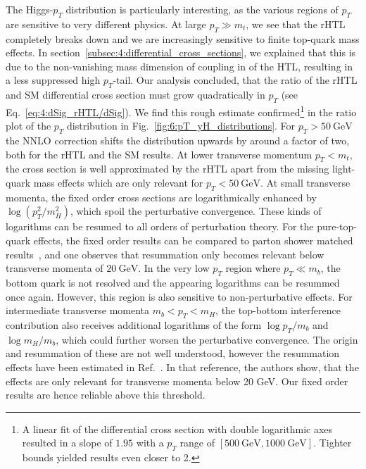 The Higgs-$p_T$ distribution is particularly interesting, as the various regions of $p_T$ are sensitive to very different physics. At large $p_T \gg m_t$, we see that the \acs{rHTL} completely breaks down and we are increasingly sensitive to finite top-quark mass effects. In section~\ref{subsec:4:differential_cross_sections}, we explained that this is due to the non-vanishing mass dimension of coupling in of the \acs{HTL}, resulting in a less suppressed high $p_T$-tail. Our analysis concluded, that the ratio of the \acs{rHTL} and \acs{SM} differential cross section must grow quadratically in $p_T$ (see Eq.~\eqref{eq:4:dSig_rHTL/dSig}). We find this rough estimate confirmed\footnote{A linear fit of the differential cross section with double logarithmic axes resulted in a slope of $1.95$ with a $p_T$ range of $[500\ \mathrm{GeV}, 1000\ \mathrm{GeV}]$. Tighter bounds yielded results even closer to 2.} in the ratio plot of the $p_T$ distribution in Fig.~\ref{fig:6:pT_yH_distributions}. For $p_T > 50\ \mathrm{GeV}$ the \acs{NNLO} correction shifts the distribution upwards by around a factor of two, both for the \acs{rHTL} and the \acs{SM} results.
At lower transverse momentum $p_T < m_t$, the cross section is well approximated by the \acs{rHTL} apart from the missing light-quark mass effects which are only relevant for $p_T < 50\ \mathrm{GeV}$. At small transverse momenta, the fixed order cross sections are logarithmically enhanced by $\log (p_T^2/m_H^2)$, which spoil the perturbative convergence. These kinds of logarithms can be resumed to all orders of perturbation theory. For the pure-top-quark effects, the fixed order results can be compared to parton shower matched results~\cite{Niggetiedt:2024nmp}, and one observes that resummation only becomes relevant below transverse momenta of $20\ \mathrm{GeV}$. In the very low $p_T$ region where $p_T \ll m_b$, the bottom quark is not resolved and the appearing logarithms can be resummed once again. However, this region is also sensitive to non-perturbative effects. For intermediate transverse momenta  $m_b < p_T < m_H$, the top-bottom interference contribution also receives additional logarithms of the form $\log p_T/m_b$ and $\log m_H/m_b$, which could further worsen the perturbative convergence. The origin and resummation of these are not well understood, however the resummation effects have been estimated in Ref.~\cite{Caola:2018zye}. In that reference, the authors show, that the effects are only relevant for transverse momenta below 20 GeV. Our fixed order results are hence reliable above this threshold.

